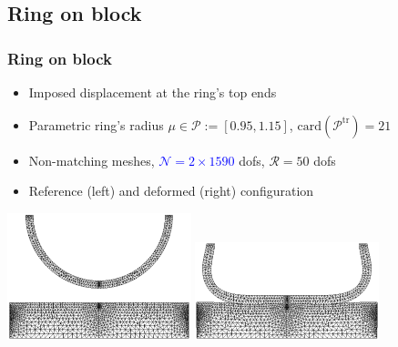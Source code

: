 \documentclass[a4paper,10pt]{beamer}
\newcommand\bl[1]{\textcolor{blue} {#1} }
\newcommand\ma[1]{\textcolor{royalmagenta} {#1} }
\begin{document}
\subsection{Ring on block}
\begin{frame}\frametitle{Ring on block}
	\begin{itemize}
		\item Imposed displacement at the ring's top ends
		\item Parametric ring's radius $\mu\in\mathcal P:=[0.95,1.15]$,
		$\mathrm{card}(\mathcal P^{\mathrm{tr}})=21$
		\item Non-matching meshes, \bl{$\mathcal N=2{\times}1590$} dofs, \ma{$\mathcal R = 50$ dofs}
		\item Reference (left) and deformed (right) configuration
	\end{itemize}
	\begin{center}
		\includegraphics[width=0.4\textwidth]{./images/contact/ref_mesh.png}\quad
		\includegraphics[width=0.4\textwidth]{./images/contact/def_mesh_1,1.png}
	\end{center}
\end{frame}
\end{document}
